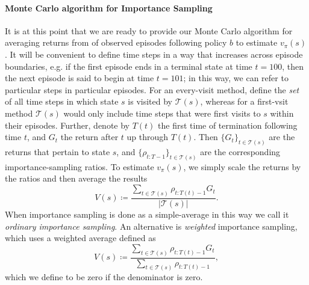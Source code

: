 \documentclass[12pt]{article}
\begin{document}
\paragraph{Monte Carlo algorithm for Importance Sampling}
It is at this point that we are ready to provide our Monte Carlo algorithm for averaging returns from of observed episodes following policy $b$ to estimate $v_\pi(s)$. It will be convenient to define time steps in a way that increases across episode boundaries, e.g. if the first episode ends in a terminal state at time $t=100$, then the next episode is said to begin at time $t=101$; in this way, we can refer to particular steps in particular episodes. For an every-visit method, define
the \emph{set} of all time steps in which state $s$ is visited by $\mathcal T(s)$, whereas for a first-vsit method $\mathcal T(s)$ would only include time steps that were first visits to $s$ within their episodes. Further, denote by $T(t)$ the first time of termination following time $t$, and $G_t$ the return after $t$ up through $T(t)$. Then $\{G_t\}_{t \in \mathcal T(s)}$ are the returns that pertain to state $s$, and $\{\rho_{t:T-1}\}_{t \in \mathcal T(s)}$ are the corresponding importance-sampling ratios. To estimate $v_\pi(s)$, we simply scale the returns by the ratios and then average the results
\begin{equation}
  \label{eq: ordinaryimportancesamplingstatevaluestimation}
  V(s) \coloneqq \frac{\sum_{t \in \mathcal T(s)} \rho_{t:T(t)-1} G_t}{|\mathcal T(s)|}.
\end{equation}
When importance sampling is done as a simple-average in this way we call it \emph{ordinary importance sampling}. An alternative is \emph{weighted} importance sampling, which uses a weighted average defined as
\begin{equation}
  V(s) \coloneqq \frac{\sum_{t \in \mathcal T(s)} \rho_{t:T(t)-1} G_t}{\sum_{t \in \mathcal T(s)} \rho_{t:T(t)-1}},
\end{equation}
which we define to be zero if the denominator is zero.
\end{document}
